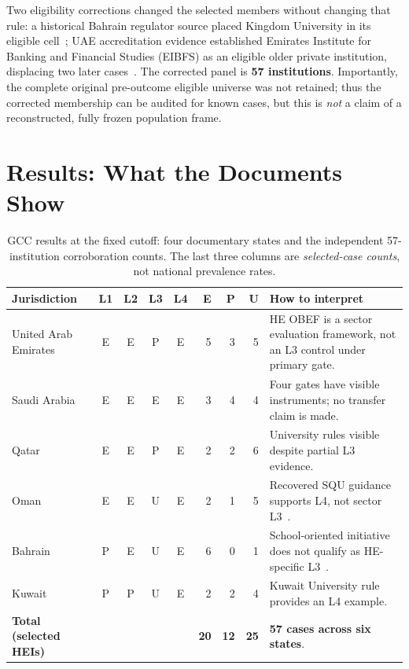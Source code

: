 \documentclass[conference,letterpaper]{IEEEtran}
\begin{document}
Two eligibility corrections changed the selected members without changing that rule: a historical Bahrain regulator source placed Kingdom University in its eligible cell~\cite{bqa1,bqa2}; UAE accreditation evidence established Emirates Institute for Banking and Financial Studies (EIBFS) as an eligible older private institution, displacing two later cases~\cite{caa1,caa2}. The corrected panel is \textbf{57 institutions}. Importantly, the complete original pre-outcome eligible universe was not retained; thus the corrected membership can be audited for known cases, but this is \emph{not} a claim of a reconstructed, fully frozen population frame.

\section{Results: What the Documents Show}
\begin{table}[t]
\centering\caption{GCC results at the fixed cutoff: four documentary states and the independent 57-institution corroboration counts. The last three columns are \emph{selected-case counts}, not national prevalence rates.}
\label{tab:core}\small
\setlength{\tabcolsep}{6pt}
\begin{tabularx}{\textwidth}{@{}p{}ccccrrrX@{}}
\toprule
Jurisdiction & L1 & L2 & L3 & L4 & E & P & U & How to interpret\tabularnewline\midrule
United Arab Emirates & E & E & P & E & 5 & 3 & 5 & HE OBEF is a sector evaluation framework, not an L3 control under primary gate.\tabularnewline
Saudi Arabia & E & E & E & E & 3 & 4 & 4 & Four gates have visible instruments; no transfer claim is made.\tabularnewline
Qatar & E & E & P & E & 2 & 2 & 6 & University rules visible despite partial L3 evidence.\tabularnewline
Oman & E & E & U & E & 2 & 1 & 5 & Recovered SQU guidance supports L4, not sector L3~\cite{squ}.\tabularnewline
Bahrain & P & E & U & E & 6 & 0 & 1 & School-oriented initiative does not qualify as HE-specific L3~\cite{bahrain}.\tabularnewline
Kuwait & P & P & U & E & 2 & 2 & 4 & Kuwait University rule provides an L4 example.\tabularnewline\midrule
\textbf{Total (selected HEIs)} & & & & & \textbf{20} & \textbf{12} & \textbf{25} & \textbf{57 cases across six states}.\tabularnewline\bottomrule
\end{tabularx}
\end{table}
\end{document}
